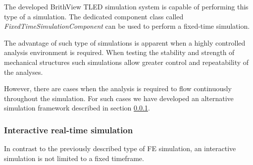   The developed BrithView TLED simulation system is capable of performing this type of a simulation. The dedicated component class called \textit{FixedTimeSimulationComponent} can be used to perform a fixed-time simulation.

  The advantage of such type of simulations is apparent when a highly controlled analysis environment is required. When testing the stability and strength of mechanical structures such simulations allow greater control and repeatability of the analyses.

  However, there are cases when the analysis is required to flow continuously throughout the simulation. For such cases we have developed an alternative simulation framework described in section \ref{methodology-fea-interactive}.

  \subsubsection{Interactive real-time simulation}\label{methodology-fea-interactive}

  In contrast to the previously described type of FE simulation, an interactive simulation is not limited to a fixed timeframe.
